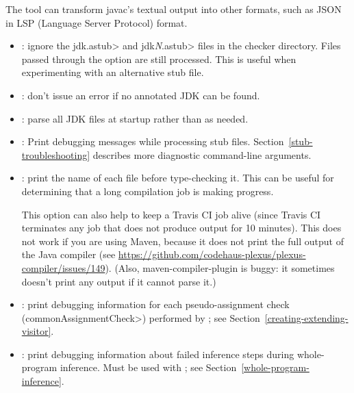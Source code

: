 The
tool can transform javac's textual output into other formats, such as JSON
in LSP (Language Server Protocol) format.



\begin{itemize}

\item {}:
  ignore the \<jdk.astub> and \<jdk\emph{N}.astub> files in the checker directory. Files passed
  through the  option are still processed. This is useful
  when experimenting with an alternative stub file.

\item {}:
  don't issue an error if no annotated JDK can be found.

\item {}:
  parse all JDK files at startup rather than as needed.

\item {}:
  Print debugging messages while processing stub files.
  Section~\ref{stub-troubleshooting} describes more diagnostic command-line
  arguments.

\end{itemize}


\begin{itemize}

\item {}: print the name of each file before type-checking it.
This can be useful for determining that a long compilation job is making
progress.

This option can also help to keep a Travis CI job alive (since Travis CI
terminates any job that does not produce output for 10 minutes).
This does not work if you are using Maven, because it does not print
the full output of the Java compiler (see \url{https://github.com/codehaus-plexus/plexus-compiler/issues/149}).
(Also, maven-compiler-plugin is buggy: it sometimes
doesn't print any output if it cannot parse it.)

\item {}: print debugging information for each
pseudo-assignment check (\<commonAssignmentCheck>) performed by
; see
Section~\ref{creating-extending-visitor}.

\item {}: print debugging information
about failed inference steps during whole-program inference. Must
be used with ; see Section~\ref{whole-program-inference}.

\end{itemize}

